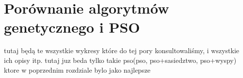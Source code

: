 \chapter{Porównanie algorytmów genetycznego i PSO}
\label{cha:psovsemas}


tutaj będą te wszystkie wykresy które do tej pory konsultowaliśmy, i wszystkie ich opisy itp.
tutaj juz beda tylko takie pso(pso, pso+sasiedztwo, pso+wyspy) ktore w poprzednim rozdziale bylo jako najlepsze







